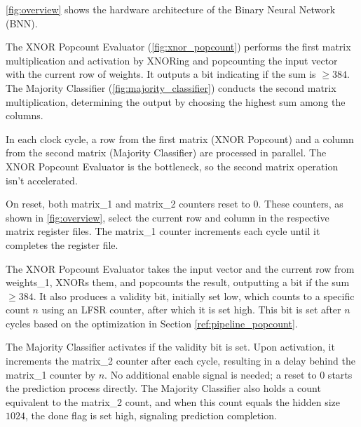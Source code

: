 \documentclass[conference]{IEEEtran}
\begin{document}


\autoref{fig:overview} shows the hardware architecture of the Binary Neural Network (BNN). 

The XNOR Popcount Evaluator (\autoref{fig:xnor_popcount}) performs the first matrix multiplication and activation by XNORing and popcounting the input vector with the current row of weights. It outputs a bit indicating if the sum is $\geq 384$. The Majority Classifier (\autoref{fig:majority_classifier}) conducts the second matrix multiplication, determining the output by choosing the highest sum among the columns.

In each clock cycle, a row from the first matrix (XNOR Popcount) and a column from the second matrix (Majority Classifier) are processed in parallel. The XNOR Popcount Evaluator is the bottleneck, so the second matrix operation isn't accelerated. 

On reset, both matrix\_1 and matrix\_2 counters reset to 0. These counters, as shown in \autoref{fig:overview}, select the current row and column in the respective matrix register files. The matrix\_1 counter increments each cycle until it completes the register file. 

The XNOR Popcount Evaluator takes the input vector and the current row from weights\_1, XNORs them, and popcounts the result, outputting a bit if the sum $\geq 384$. It also produces a validity bit, initially set low, which counts to a specific count $n$ using an LFSR counter, after which it is set high. This bit is set after $n$ cycles based on the optimization in Section \ref{ref:pipeline_popcount}.

The Majority Classifier activates if the validity bit is set. Upon activation, it increments the matrix\_2 counter after each cycle, resulting in a delay behind the matrix\_1 counter by $n$. No additional enable signal is needed; a reset to 0 starts the prediction process directly. The Majority Classifier also holds a count equivalent to the matrix\_2 count, and when this count equals the hidden size $1024$, the done flag is set high, signaling prediction completion.
\end{document}
